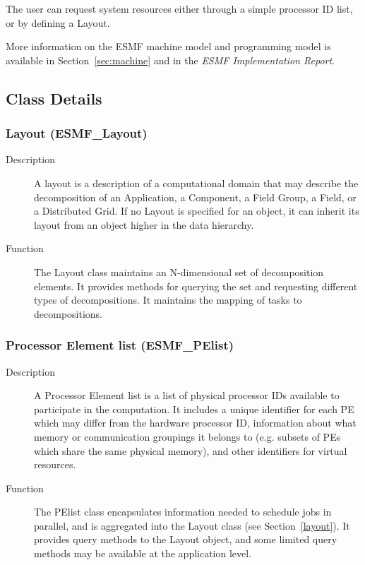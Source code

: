 The user can request system resources either through a simple processor
ID list, or by defining a Layout.

More information on the ESMF machine model and programming model
is available in Section~\ref{sec:machine} and in the {\it ESMF
Implementation Report}.

\subsection{Class Details}

\subsubsection{Layout (ESMF\_Layout)}
\label{sec:layout} 
\begin{description}
\item [Description] A layout is a description of a computational domain that
may describe the decomposition of an Application, a Component, a Field Group, a Field, or 
a Distributed Grid.
If no Layout is specified for an object, it can inherit its layout from an object
higher in the data hierarchy.  
\item [Function] The Layout class maintains an N-dimensional set of decomposition
elements.  It provides methods for querying the set and requesting different
types of decompositions.  It maintains the mapping of tasks to decompositions.
\end{description}

\subsubsection{Processor Element list (ESMF\_PElist)}
\label{sec:pelist} 
\begin{description}
\item [Description] A Processor Element list is a list of physical processor IDs
available to participate in the computation.  
It includes a unique identifier for each PE which may differ from the
hardware processor ID, 
information about what memory or communication groupings it belongs to (e.g. subsets 
of PEs which share the same physical memory), 
and other identifiers for virtual resources.  
\item [Function] The PElist class encapsulates information needed to schedule
jobs in parallel, and is aggregated into the Layout class (see Section~\ref{layout}).
It provides query methods to the Layout object, and some limited query methods
may be available at the application level.
\end{description}

